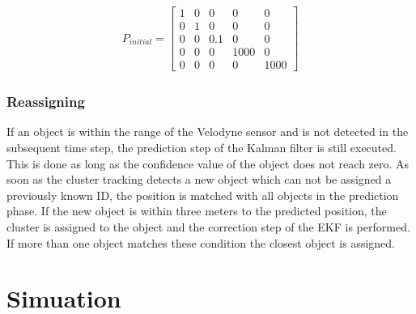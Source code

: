 \documentclass[11pt,oneside,openright]{mpreport}
\begin{document}
\begin{align*}
P_{initial}=
\begin{bmatrix}
1 & 0 & 0 & 0 & 0\\
0 & 1 & 0 & 0 & 0\\
0 & 0 & 0.1 & 0 & 0\\
0 & 0 & 0 & 1000 & 0\\
0 & 0 & 0 & 0 & 1000
\end{bmatrix} 
\end{align*}



\subsection{Reassigning}

If an object is within the range of the Velodyne sensor and is not detected in the subsequent time step, the prediction step of the Kalman filter is still executed.
This is done as long as the confidence value of the object does not reach zero. As soon as the cluster tracking detects a new object which can not be assigned a previously known ID,
the position is matched with all objects in the prediction phase. If the new object is within three meters to the predicted position, the cluster is assigned to the object
and the correction step of the EKF is performed. If more than one object matches these condition the closest object is assigned.

\chapter{Simuation}
\end{document}
